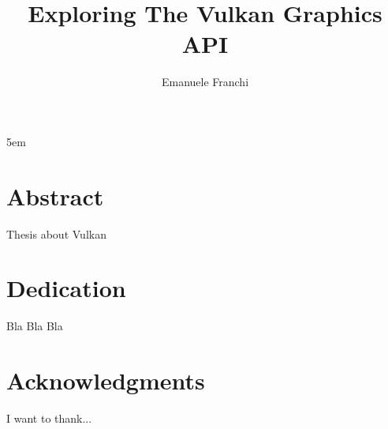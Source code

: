 \documentclass[a4paper]{report}
\author{Emanuele Franchi}
\title{Exploring The Vulkan Graphics API}
\begin{document}
\emergencystretch 5em

\maketitle

\chapter*{Abstract}
Thesis about Vulkan

\chapter*{Dedication}
Bla Bla Bla

\chapter*{Acknowledgments}
I want to thank...

\tableofcontents
\listoffigures
\lstlistoflistings














\appendix




\nocite{*}

\end{document}
